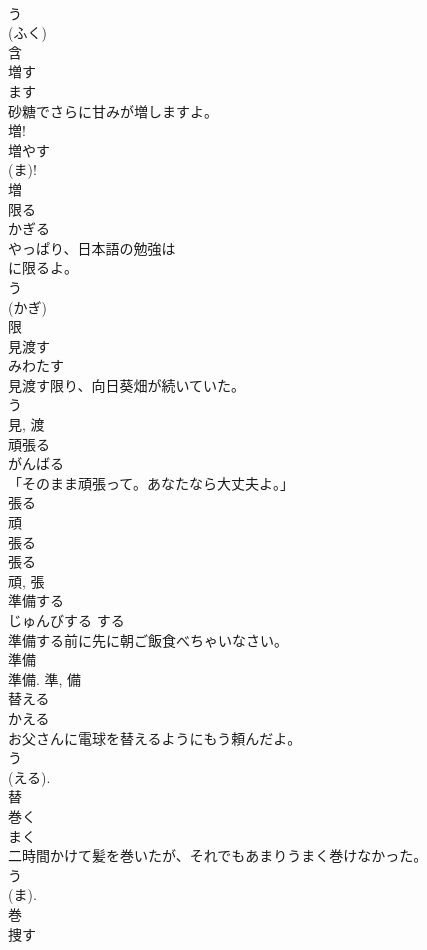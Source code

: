 \documentclass[8pt]{extreport}
\begin{document}
\begin{CJK}{UTF8}{min}
\\	う 
\\	(ふく) 
\\	含	
\\	増す	
\\	ます	
\\	砂糖でさらに甘みが増しますよ。	
\\	増! 
\\	増やす 
\\	(ま)! 
\\	増	
\\	限る	
\\	かぎる	
\\	やっぱり、日本語の勉強は
\\	に限るよ。	
\\	う 
\\	(かぎ) 
\\	限	
\\	見渡す	
\\	みわたす	
\\	見渡す限り、向日葵畑が続いていた。	
\\	う 
\\	見, 渡	
\\	頑張る	
\\	がんばる	
\\	「そのまま頑張って。あなたなら大丈夫よ。」	
\\	張る 
\\	頑 
\\	張る 
\\	張る 
\\	頑, 張	
\\	準備する	
\\	じゅんびする	する 
\\	準備する前に先に朝ご飯食べちゃいなさい。	
\\	準備 
\\	準備.	準, 備	
\\	替える	
\\	かえる	
\\	お父さんに電球を替えるようにもう頼んだよ。	
\\	う 
\\	(える). 
\\	替	
\\	巻く	
\\	まく	
\\	二時間かけて髪を巻いたが、それでもあまりうまく巻けなかった。	
\\	う 
\\	(ま). 
\\	巻	
\\	捜す	

\end{CJK}
\end{document}
